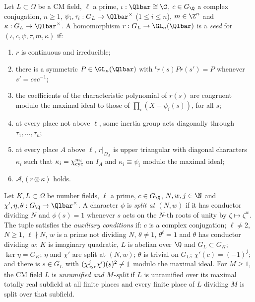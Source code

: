 \begin{definition}[Seeds]\label{pf:eis:seed}
Let $L\subset\Omega$ be a CM field, $\ell$ a prime, $\iota:\Qlbar\cong\C$, $c\in G_\Q$ a complex conjugation, $n\ge1$,
$\psi_i,\tau_i:G_L\to\Qlbar^\times$ ($1\le i\le n$), $m\in\Z^n$ and $\kappa:G_L\to\Qlbar^\times$. A homomorphism $r:G_L\to\GL_n(\Qlbar)$ is a
\emph{seed} for $(\iota,c,\psi,\tau,m,\kappa)$ if:
\begin{enumerate}[label=(\alph*)]
\item $r$ is continuous and irreducible;
\item there is a symmetric $P\in\GL_n(\Qlbar)$ with ${}^tr(s)Pr(s')=P$ whenever $s'=csc^{-1}$;
\item the coefficients of the characteristic polynomial of $r(s)$ are congruent modulo the maximal ideal to those of
  $\prod_i(X-\psi_i(s))$, for all $s$;
\item at every place not above $\ell$, some inertia group acts diagonally through $\tau_1,\dots,\tau_n$;
\item at every place $A$ above $\ell$, $r|_{D_A}$ is upper triangular with diagonal characters $\kappa_i$ such that $\kappa_i=\chi_{\mathrm{cyc}}^{m_i}$ on
  $I_A$ and $\kappa_i\equiv\psi_i$ modulo the maximal ideal;
\item $\mathcal A_\iota(r\otimes\kappa)$ holds.
\end{enumerate}
\end{definition}

\begin{definition}\label{pf:eis:fieldpair}
Let $K,L\subset\Omega$ be number fields, $\ell$ a prime, $c\in G_\Q$, $N,w,j\in\N$ and $\chi',\eta,\theta:G_\Q\to\Qlbar^\times$. A character
$\phi$ is \emph{split at $(N,w)$} if it has conductor dividing $N$ and $\phi(s)=1$ whenever $s$ acts on the $N$-th roots of unity by
$\zeta\mapsto\zeta^w$. The tuple satisfies the \emph{auxiliary conditions} if: $c$ is a complex conjugation; $\ell\ne2$, $N\ge1$,
$\ell\nmid N$, $w$ is a prime not dividing $N$, $\theta\ne1$, $\theta^\ell=1$ and $\theta$ has conductor dividing $w$; $K$ is imaginary
quadratic, $L$ is abelian over $\Q$ and $G_L\subset G_K$; $\ker\eta=G_K$; $\eta$ and $\chi'$ are split at $(N,w)$; $\theta$ is trivial on $G_L$;
$\chi'(c)=(-1)^j$; and there is $s\in G_L$ with $(\chi_{\mathrm{cyc}}^j\chi')(s)^2\not\equiv1$ modulo the maximal ideal. For $M\ge1$, the CM field $L$
is \emph{unramified and $M$-split} if $L$ is unramified over its maximal totally real subfield at all finite places and every finite
place of $L$ dividing $M$ is split over that subfield.
\end{definition}

